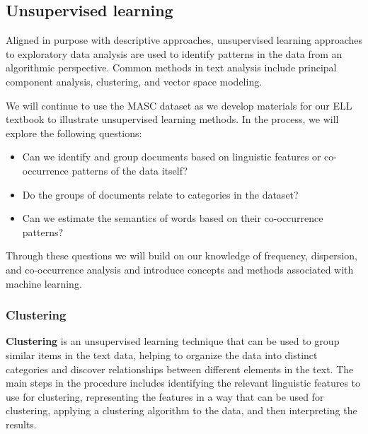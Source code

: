 \documentclass[
  letterpaper,
  krantz1]{latex/krantz-mod}
\providecommand{\tightlist}{%
  \setlength{\itemsep}{0pt}\setlength{\parskip}{0pt}}\usepackage{longtable,booktabs,array}
\theoremstyle{definition}
\theoremstyle{definition}
\theoremstyle{remark}
\begin{document}
\subsection{Unsupervised learning}\label{sec-explore-unsupervised}

Aligned in purpose with descriptive approaches, unsupervised
learning approaches to exploratory data
analysis are used to identify
patterns in the data from an algorithmic perspective. Common methods in
text analysis include principal component analysis, clustering, and
vector space modeling.

We will continue to use the MASC
dataset
as we develop materials for our ELL textbook to illustrate unsupervised
learning methods. In the process, we will explore the following
questions:

\begin{itemize}
\tightlist
\item
  Can we identify and group documents based on linguistic features or
  co-occurrence patterns of the data itself?
\item
  Do the groups of documents relate to categories in the dataset?
\item
  Can we estimate the semantics of words based on their co-occurrence
  patterns?
\end{itemize}

Through these questions we will build on our knowledge of frequency,
dispersion, and co-occurrence analysis and introduce concepts and
methods associated with machine learning.

\subsubsection{Clustering}\label{sec-explore-clustering}

\textbf{Clustering} is an unsupervised learning
technique that can be used to group similar items in the text data,
helping to organize the data into distinct categories and discover
relationships between different elements in the text. The main steps in
the procedure includes identifying the relevant linguistic
features to use for clustering, representing
the features in a way that can be used for
clustering, applying a clustering algorithm to the data, and then
interpreting the results.
\end{document}
